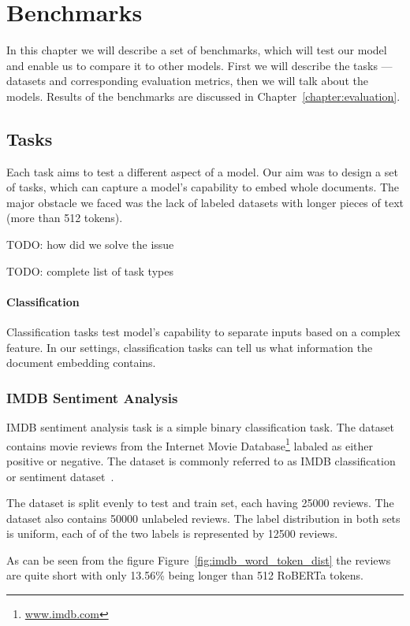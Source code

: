 \chapter{Benchmarks}

In this chapter we will describe a set of benchmarks, which will test our model
and enable us to compare it to other models. First we will describe the tasks
--- datasets and corresponding evaluation metrics, then we will talk about the
models. Results of the benchmarks are discussed in
Chapter~\ref{chapter:evaluation}.

\section{Tasks}

Each task aims to test a different aspect of a model. Our aim was to design a
set of tasks, which can capture a model's capability to embed whole documents.
The major obstacle we faced was the lack of labeled datasets with longer pieces
of text (more than 512 tokens).

TODO: how did we solve the issue

TODO: complete list of task types

\subsubsection{Classification}

Classification tasks test model's capability to separate inputs based on a
complex feature. In our settings, classification tasks can tell us what
information the document embedding contains.


\subsection{IMDB Sentiment Analysis}

IMDB sentiment analysis task is a simple binary classification task. The dataset
contains movie reviews from the Internet Movie
Database\footnote{\url{www.imdb.com}} labaled as either positive or negative.
The dataset is commonly referred to as IMDB classification or sentiment
dataset~\cite{maas11}.

The dataset is split evenly to test and train set, each having 25000 reviews.
The dataset also contains 50000 unlabeled reviews. The label distribution in
both sets is uniform, each of of the two labels is represented by 12500 reviews.

As can be seen from the figure Figure~\ref{fig:imdb_word_token_dist} the reviews
are quite short with only 13.56\% being longer than 512 RoBERTa tokens.

